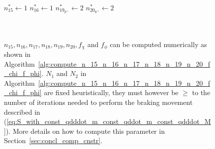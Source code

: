 \begin{figure}[!htbp]
\begin{minipage}{\textwidth}
\begin{algorithm}[H]
\begin{algorithmic}[1]
        \EndIf
            {$n_{15}^{*} \gets 1$}%
            {$n_{16}^{*} \gets 1$}%
            {$n_{{19}_{\mathbb{R}^{+}}}^{*} \gets 2$}%
            {$n_{{20}_{\mathbb{R}^{+}}}^{*} \gets 2$}%
\EndIf 
{}
\EndIf 
\EndFor
\EndFor
{}
\myState {}\;
\end{algorithmic}
\end{algorithm}
\end{minipage} \\
\\
$n_{15}, n_{16}, n_{17}, n_{18}, n_{19}, n_{20}, f_{\chi}$ and $f_{\phi}$ can be computed numerically as shown in Algorithm~\ref{alg:compute_n_15_n_16_n_17_n_18_n_19_n_20_f_chi_f_phi}. $N_1$ and $N_2$ in Algorithm~\ref{alg:compute_n_15_n_16_n_17_n_18_n_19_n_20_f_chi_f_phi} are fixed heuristically, they must however be $\geq$ to the number of iterations needed to perform the braking movement described in (\ref{eq:S_with_const_qdddot_m_const_qddot_m_const_qdddot_M}). More details on how to compute this parameter in Section~\ref{sec:concl_comp_cnstr}.

\end{figure}
